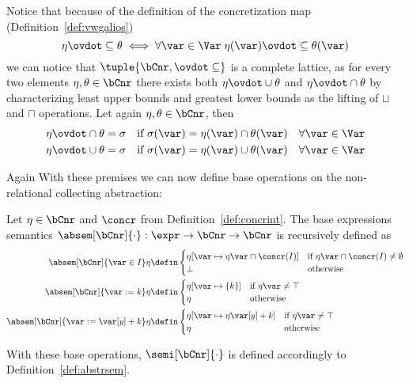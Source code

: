 Notice that because of the definition of the concretization map
(Definition~\ref{def:vwgalios})
\begin{equation*}
  \eta \ovdot\subseteq \theta \iff \forall \var \in \Var \; \eta(\var) \ovdot\subseteq \theta(\var)
\end{equation*}
we can notice that \(\tuple{\bCnr, \ovdot\subseteq}\) is a complete
lattice, as for every two elements \(\eta,\theta\in\bCnr\) there
exists both \(\eta \ovdot\cup \theta\) and \(\eta \ovdot\cap \theta\)
by characterizing least upper bounds and greatest lower bounds as the
lifting of \(\sqcup\) and \(\sqcap\) operations. Let again
\(\eta, \theta \in \bCnr\), then
\begin{align*}
  \eta \ovdot\cap \theta = \sigma & \quad \text{if } \sigma(\var) = \eta(\var) \cap \theta(\var) \quad \forall \var\in\Var \\
  \eta \ovdot\cup \theta = \sigma & \quad \text{if } \sigma(\var) = \eta(\var) \cup \theta(\var) \quad \forall \var\in\Var
\end{align*}

Again With these premises we can now define base
operations on the non-relational collecting abstraction:
\begin{definition}
  Let \(\eta \in \bCnr\) and \(\concr\) from
  Definition~\ref{def:concrint}. The base expressions semantics
  \(\absem[\bCnr]{\cdot} : \expr \to \bCnr \to \bCnr\) is recursively
  defined as
  \begin{align*}
    \absem[\bCnr]{\var\in I}\eta & \defin
                                   \begin{cases}
                                     \eta[\var\mapsto\eta\var\cap \concr(I)] & \text{if } \eta\var\cap \concr(I) \neq \emptyset \\
                                     \bot & \text{otherwise}
                                   \end{cases} \\
    \absem[\bCnr]{\var := k}\eta & \defin
                                   \begin{cases}
                                     \eta[\var\mapsto\{k\}] & \text{if } \eta\var\neq\top \\
                                     \eta & \text{otherwise}
                                   \end{cases} \\
    \absem[\bCnr]{\var := \var[y] + k}\eta & \defin
                                             \begin{cases}
                                               \eta[\var\mapsto\eta\var[y] + k] & \text{if } \eta\var\neq\top \\
                                               \eta & \text{otherwise}
                                             \end{cases}
  \end{align*}
\end{definition}
With these base operations, \(\semi[\bCnr]{\cdot}\) is defined
accordingly to Definition~\ref{def:abstrsem}.
